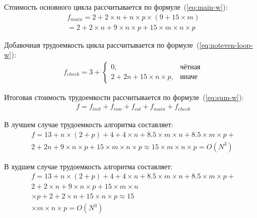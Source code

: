 Стоимость основного цикла рассчитывается по формуле~(\ref{eq:main-w}):
\begin{equation}
    \label{eq:main-w}
    \begin{gathered}
        f_{main} = 2 + 2 \times n + n \times p \times (9 + 15 \times m) \\
        = 2 + 2 \times n + 9 \times n \times p + 15 \times m \times n \times p
    \end{gathered} 
\end{equation}

Добавочная трудоемкость цикла рассчитывается по формуле~(\ref{eq:noteven-loop-w}):
\begin{equation}
    \label{eq:noteven-loop-w}
    \begin{gathered}
        f_{check} = 3 + 
        \begin{cases}
            0, & \text{чётная} \\
            2 + 2n + 15\times n \times p, & \text{иначе}
        \end{cases}
    \end{gathered}  
\end{equation}

Итоговая стоимость трудоемкости рассчитывается по формуле~(\ref{eq:sum-w}):
\begin{equation}
    \label{eq:sum-w}
    \begin{gathered}
        f = f_{init} + f_{row} + f_{col} + f_{main} + f_{check}  
    \end{gathered} 
\end{equation}

В лучшем случае трудоемкость алгоритма составляет:
\begin{equation}
    \label{eq:best-w}
    \begin{gathered}
        f = 13 + n \times (2 + p) + 4 + 4 \times n + 8.5 \times m \times n + 8.5 \times m \times p + \\
        2 + 2n + 9 \times n \times p + 15 \times m \times n \times p \approx 15 \times m \times n \times p = O(N^3)
    \end{gathered} 
\end{equation}

В худшем случае трудоемкость алгоритма составляет:
\begin{equation}
    \label{eq:worst-w}
    \begin{gathered}
        f = 13 + n \times (2 + p) + 4 + 4 \times n + 8.5 \times m \times n + 8.5 \times m \times p + \\
        2 + 2 \times n + 9 \times n \times p + 15 \times m \times n \\ \times p + 2 + 2 \times n + 15 \times n \times p \approx 15  \\\times m \times n \times p = O(N^3)
    \end{gathered} 
\end{equation}

